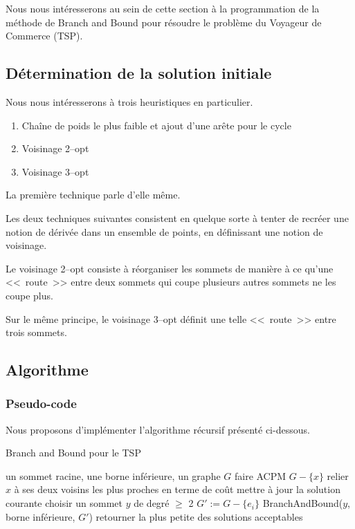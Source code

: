 Nous nous intéresserons au sein de cette section à la programmation de
la méthode de Branch and Bound pour résoudre le problème du Voyageur
de Commerce (TSP).

\subsection{Détermination de la solution initiale}

Nous nous intéresserons à trois heuristiques en particulier.
\begin{enumerate}
\item Chaîne de poids le plus faible et ajout d'une arête pour le
  cycle
\item Voisinage 2--opt
\item Voisinage 3--opt
\end{enumerate}

La première technique parle d'elle même. 

Les deux techniques suivantes consistent en quelque sorte à tenter de
recréer une notion de dérivée dans un ensemble de points, en
définissant une notion de voisinage.

Le voisinage 2--opt consiste à réorganiser les sommets de manière à ce
qu'une <<~route~>> entre deux sommets qui coupe plusieurs autres sommets ne les coupe plus.

Sur le même principe, le voisinage 3--opt définit une telle
<<~route~>> entre trois sommets.

\subsection{Algorithme}

\subsubsection{Pseudo-code}

Nous proposons d'implémenter l'algorithme récursif présenté ci-dessous.

\begin{algorithm}[!ht]
\caption{Branch and Bound pour le TSP}
\label{BBtsp}
\begin{algorithmic}[1]
\REQUIRE un sommet racine, une borne inférieure, un graphe $G$
\STATE faire ACPM $G - \{x \}$
\STATE relier $x$ à ses deux voisins les plus proches en terme de coût
\STATE mettre à jour la solution courante
\ELSE
\STATE choisir un sommet $y$ de degré $\geq$ 2
\STATE $G' := G - \{ e_i \}$
\STATE BranchAndBound($y$, borne inférieure, $G'$)
\ENDFOR
\ENDIF
\ENDIF
\STATE retourner la plus petite des solutions acceptables
\end{algorithmic}
\end{algorithm}

